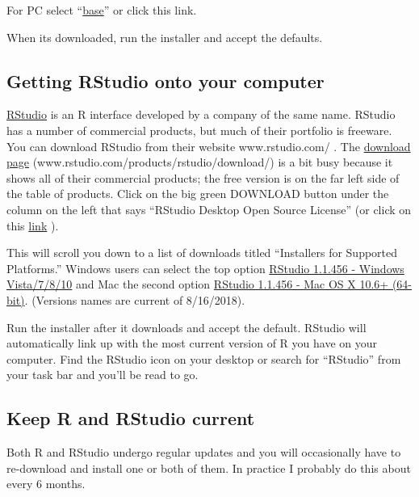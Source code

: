 \documentclass[
]{book}
\begin{document}
For PC select ``\href{https://cran.r-project.org/bin/windows/base/}{base}'' or click this link.

When its downloaded, run the installer and accept the defaults.

\hypertarget{getting-rstudio-onto-your-computer}{%
\subsection{Getting RStudio onto your computer}\label{getting-rstudio-onto-your-computer}}

\href{www.rstudio.com/}{RStudio} is an R interface developed by a company of the same name. RStudio has a number of commercial products, but much of their portfolio is freeware. You can download RStudio from their website www.rstudio.com/ . The \href{https://www.rstudio.com/products/rstudio/download/}{download page} (www.rstudio.com/products/rstudio/download/) is a bit busy because it shows all of their commercial products; the free version is on the far left side of the table of products. Click on the big green DOWNLOAD button under the column on the left that says ``RStudio Desktop Open Source License'' (or click on this \href{https://www.rstudio.com/products/rstudio/download/\#download}{link} ).

This will scroll you down to a list of downloads titled ``Installers for Supported Platforms.'' Windows users can select the top option \href{https://download1.rstudio.org/RStudio-1.1.456.exe}{RStudio 1.1.456 - Windows Vista/7/8/10} and Mac the second option \href{https://download1.rstudio.org/RStudio-1.1.456.dmg}{RStudio 1.1.456 - Mac OS X 10.6+ (64-bit)}. (Versions names are current of 8/16/2018).

Run the installer after it downloads and accept the default. RStudio will automatically link up with the most current version of R you have on your computer. Find the RStudio icon on your desktop or search for ``RStudio'' from your task bar and you'll be read to go.

\hypertarget{keep-r-and-rstudio-current}{%
\subsection{Keep R and RStudio current}\label{keep-r-and-rstudio-current}}

Both R and RStudio undergo regular updates and you will occasionally have to re-download and install one or both of them. In practice I probably do this about every 6 months.
\end{document}
